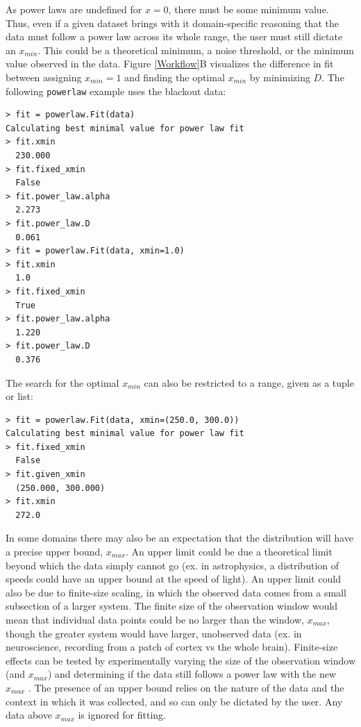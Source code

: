 \documentclass[10pt]{article}
\begin{document}
As power laws are undefined for $x=0$, there must be some minimum value. Thus, even if a given dataset brings with it domain-specific reasoning that the data must follow a power law across its whole range, the user must still dictate an $x_{min}$. This could be a theoretical minimum, a noise threshold, or the minimum value observed in the data. Figure \ref{Workflow}B visualizes the difference in fit between assigning $x_{min}=1$ and finding the optimal $x_{min}$ by minimizing $D$. The following \verb$powerlaw$ example uses the blackout data:

\begin{verbatim}
> fit = powerlaw.Fit(data)
Calculating best minimal value for power law fit
> fit.xmin
  230.000
> fit.fixed_xmin
  False
> fit.power_law.alpha
  2.273
> fit.power_law.D
  0.061
> fit = powerlaw.Fit(data, xmin=1.0)
> fit.xmin
  1.0
> fit.fixed_xmin
  True
> fit.power_law.alpha
  1.220
> fit.power_law.D
  0.376
\end{verbatim}

The search for the optimal $x_{min}$ can also be restricted to a range, given as a tuple or list:
\begin{verbatim}
> fit = powerlaw.Fit(data, xmin=(250.0, 300.0))
Calculating best minimal value for power law fit
> fit.fixed_xmin
  False
> fit.given_xmin
  (250.000, 300.000)
> fit.xmin
  272.0
\end{verbatim}

In some domains there may also be an expectation that the distribution will have a precise upper bound, $x_{max}$. An upper limit could be due a theoretical limit beyond which the data simply cannot go (ex. in astrophysics, a distribution of speeds could have an upper bound at the speed of light). An upper limit could also be due to finite-size scaling, in which the observed data comes from a small subsection of a larger system. The finite size of the observation window would mean that individual data points could be no larger than the window, $x_{max}$, though the greater system would have larger, unobserved data (ex. in neuroscience, recording from a patch of cortex vs the whole brain). Finite-size effects can be tested by experimentally varying the size of the observation window (and $x_{max}$) and determining if the data still follows a power law with the new $x_{max}$ \cite{Beggs2003, Shriki2013}. The presence of an upper bound relies on the nature of the data and the context in which it was collected, and so can only be dictated by the user. Any data above $x_{max}$ is ignored for fitting. 
\end{document}
